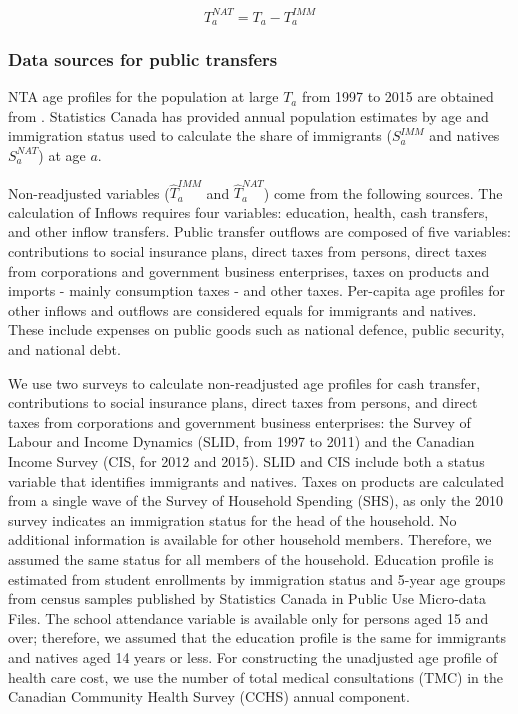 \begin{equation}\label{eq:nat}
 {T}^{NAT}_a ={T}_a -{T}^{IMM}_a
\end{equation}

\subsubsection*{Data sources for public transfers}
NTA age profiles for the population at large \({T}_a \) from 1997 to 2015 are obtained from  \citet{Merette:2019kz}.
Statistics Canada has provided annual population estimates by age and immigration status used to calculate the share of immigrants (\( S^{IMM}_a \) and natives \( S^{NAT}_a \)) at age \(a \).

Non-readjusted variables (\(\hat{T}^{IMM}_a \) and \(\hat{T}^{NAT}_a \)) come from the following sources.
The calculation of Inflows requires four variables: education, health, cash transfers, and other inflow transfers.
Public transfer outflows are composed of five variables: contributions to social insurance plans, direct taxes from persons, direct taxes from corporations and government business enterprises, taxes on products and imports - mainly consumption taxes - and other taxes.
Per-capita age profiles for other inflows and outflows are considered equals for immigrants and natives. These include expenses on public goods such as national defence, public security, and national debt.

\vspace{0.7em}\par
We use two surveys to calculate non-readjusted age profiles for cash transfer, contributions to social insurance plans, direct taxes from persons, and direct taxes from corporations and government business enterprises: the Survey of Labour and Income Dynamics (SLID, from 1997 to 2011) and the Canadian Income Survey (CIS, for 2012 and 2015).
SLID and CIS include both a status variable that identifies immigrants and natives.
Taxes on products are calculated from a single wave of the Survey of Household Spending (SHS), as only the 2010 survey indicates an immigration status for the head of the household.
No additional information is available for other household members.
Therefore, we assumed the same status for all members of the household.
Education profile is estimated from student enrollments by immigration status and 5-year age groups from census samples published by Statistics Canada in Public Use Micro-data Files. The school attendance variable is available only for persons aged 15 and over; therefore, we assumed that the education profile is the same for immigrants and natives aged 14 years or less.
For constructing the unadjusted age profile of health care cost, we use the number of total medical consultations (TMC) in the Canadian Community Health Survey (CCHS) annual component.

